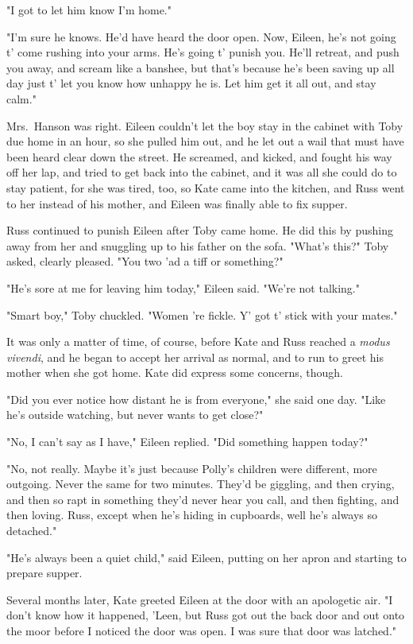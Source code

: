 "I got to let him know I'm home."

"I'm sure he knows. He'd have heard the door open. Now, Eileen, he's not going t' come rushing into your arms. He's going t' punish you. He'll retreat, and push you away, and scream like a banshee, but that's because he's been saving up all day just t' let you know how unhappy he is. Let him get it all out, and stay calm."

Mrs.~Hanson was right. Eileen couldn't let the boy stay in the cabinet with Toby due home in an hour, so she pulled him out, and he let out a wail that must have been heard clear down the street. He screamed, and kicked, and fought his way off her lap, and tried to get back into the cabinet, and it was all she could do to stay patient, for she was tired, too, so Kate came into the kitchen, and Russ went to her instead of his mother, and Eileen was finally able to fix supper.

Russ continued to punish Eileen after Toby came home. He did this by pushing away from her and snuggling up to his father on the sofa. "What's this?" Toby asked, clearly pleased. "You two 'ad a tiff or something?"

"He's sore at me for leaving him today," Eileen said. "We're not talking."

"Smart boy," Toby chuckled. "Women 're fickle. Y' got t' stick with your mates."

It was only a matter of time, of course, before Kate and Russ reached a \emph{modus vivendi}, and he began to accept her arrival as normal, and to run to greet his mother when she got home. Kate did express some concerns, though.

"Did you ever notice how distant he is from everyone," she said one day. "Like he's outside watching, but never wants to get close?"

"No, I can't say as I have," Eileen replied. "Did something happen today?"

"No, not really. Maybe it's just because Polly's children were different, more outgoing. Never the same for two minutes. They'd be giggling, and then crying, and then so rapt in something they'd never hear you call, and then fighting, and then loving. Russ, except when he's hiding in cupboards, well he's always so{\el} detached."

"He's always been a quiet child," said Eileen, putting on her apron and starting to prepare supper.

Several months later, Kate greeted Eileen at the door with an apologetic air. "I don't know how it happened, 'Leen, but Russ got out the back door and out onto the moor before I noticed the door was open. I was sure that door was latched."

